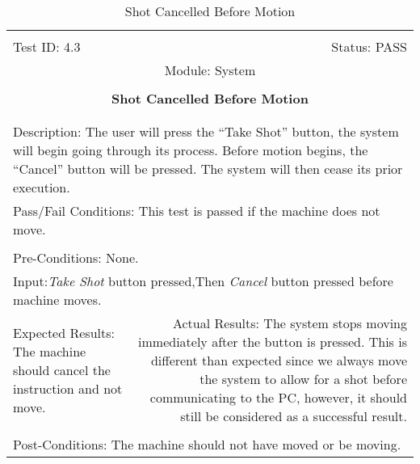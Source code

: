 \documentclass[titlepage]{article}
\begin{document}
\begin{center}
\begin{table}[h!]
\begin{tabular}{|l r|}\hline&\\[-2mm]
	Test ID: 4.3	&Status: PASS\\[-3mm]
	\multicolumn{2}{|c|}{Module: System}\\&\\
	\multicolumn{2}{|c|}{\textbf{\large{Shot Cancelled Before Motion}}}\\&\\\hline&\\[-3mm]
	\multicolumn{2}{|p{\textwidth}|}{Description: The user will press the ``Take Shot'' button, the system will begin going through its process. Before motion begins, the ``Cancel'' button will be pressed. The system will then cease its prior execution.}\\\hline
	\multicolumn{2}{|p{\textwidth}|}{Pass/Fail Conditions: This test is passed if the machine does not move.}\\[1mm]\hline&\\[-3mm]
	\multicolumn{2}{|p{\textwidth}|}{Pre-Conditions: None.}\\[4mm]
	\multicolumn{2}{|p{\textwidth}|}{Input:\newline\textit{Take Shot} button pressed,\newline Then \textit{Cancel} button pressed before machine moves.}\\[2mm]\hline
	\multicolumn{1}{|p{0.49\textwidth}}{Expected Results: The machine should cancel the instruction and not move.}	&\multicolumn{1}{|p{0.45\textwidth}|}{Actual Results: The system stops moving immediately after the button is pressed. This is different than expected since we always move the system to allow for a shot before communicating to the PC, however, it should still be considered as a successful result.}\\\hline&\\[-3mm]
	\multicolumn{2}{|p{\textwidth}|}{Post-Conditions: The machine should not have moved or be moving.}\\\hline
\end{tabular}
\caption{Shot Cancelled Before Motion}
\end{table}
\end{center}
\end{document}
